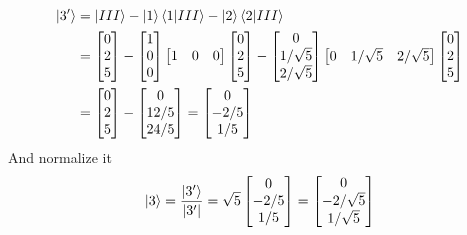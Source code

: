 \documentclass[../main.tex]{subfiles}
\begin{document}
\begin{align*}
    \ket{3'}&=\ket{III}-\ket{1}\braket{1|III}-\ket{2}\braket{2|III}\\
    &=\begin{bmatrix}
        0\\2\\5
    \end{bmatrix}-\begin{bmatrix}
        1\\0\\0
    \end{bmatrix}
    \begin{bmatrix}
        1&0&0
    \end{bmatrix}
    \begin{bmatrix}
        0\\2\\5
    \end{bmatrix}
    -
    \begin{bmatrix}
        0\\1/\sqrt{5}\\2/\sqrt{5}
    \end{bmatrix}
    \begin{bmatrix}
        0&1/\sqrt{5}&2/\sqrt{5}
    \end{bmatrix}
    \begin{bmatrix}
        0\\2\\5
    \end{bmatrix}\\
    &=\begin{bmatrix}
        0\\2\\5
    \end{bmatrix}
    -
    \begin{bmatrix}
        0\\12/5\\24/5
    \end{bmatrix}
    =
    \begin{bmatrix}
        0\\-2/5\\1/5
    \end{bmatrix}
\end{align*}
And normalize it 
\begin{equation*}
    \ket{3}=\frac{\ket{3'}}{|3'|}=\sqrt{5}\begin{bmatrix}
        0\\-2/5\\1/5
    \end{bmatrix}
    =
    \begin{bmatrix}
        0\\-2/\sqrt{5}\\1/\sqrt{5}
    \end{bmatrix}
\end{equation*}
\end{document}
